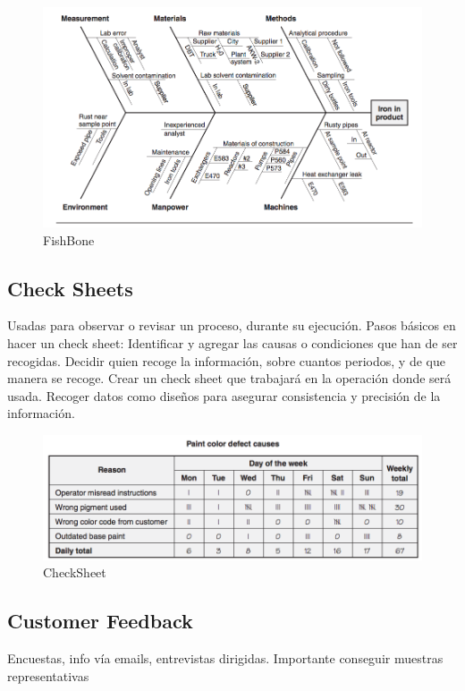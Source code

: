 \documentclass[]{article}
\begin{document}
\begin{figure}[ht!]
	\centering
	\includegraphics[width=120mm]{imagenes/FishBone.png}
	\caption{FishBone}
	\label{fig:FishBone}
\end{figure}

\subsection{Check Sheets}

Usadas para observar o revisar un proceso, durante su ejecución. Pasos básicos en hacer un check sheet: Identificar y agregar las causas o condiciones que han de ser recogidas. Decidir quien recoge la información, sobre cuantos periodos, y de que manera se recoge. Crear un check sheet que trabajará en la operación donde será usada. Recoger datos como diseños para asegurar consistencia y precisión de la información.

\begin{figure}[ht!]
	\centering
	\includegraphics[width=120mm]{imagenes/CheckSheet.png}
	\caption{CheckSheet}
	\label{fig:CheckSheet}
\end{figure}

\subsection{Customer Feedback}

Encuestas, info vía emails, entrevistas dirigidas. Importante conseguir muestras representativas
\end{document}
